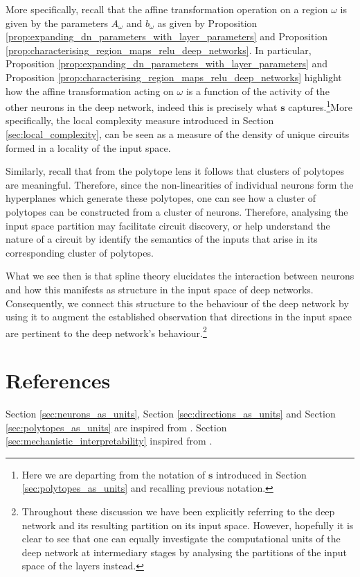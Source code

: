 More specifically, recall that the affine transformation operation on a region $\omega$ is given by the parameters $A_{\omega}$ and $b_{\omega}$ as given by Proposition \ref{prop:expanding_dn_parameters_with_layer_parameters} and Proposition \ref{prop:characterising_region_maps_relu_deep_networks}. In particular, Proposition \ref{prop:expanding_dn_parameters_with_layer_parameters} and Proposition \ref{prop:characterising_region_maps_relu_deep_networks} highlight how the affine transformation acting on $\omega$ is a function of the activity of the other neurons in the deep network, indeed this is precisely what $\mathbf{s}$ captures.\footnote{Here we are departing from the notation of $\mathbf{s}$ introduced in Section \ref{sec:polytopes_as_units} and recalling previous notation.}More specifically, the local complexity measure introduced in Section \ref{sec:local_complexity}, can be seen as a measure of the density of unique circuits formed in a locality of the input space. 

Similarly, recall that from the polytope lens it follows that clusters of polytopes are meaningful. Therefore, since the non-linearities of individual neurons form the hyperplanes which generate these polytopes, one can see how a cluster of polytopes can be constructed from a cluster of neurons. Therefore, analysing the input space partition may facilitate circuit discovery, or help understand the nature of a circuit by identify the semantics of the inputs that arise in its corresponding cluster of polytopes.

What we see then is that spline theory elucidates the interaction between neurons and how this manifests as structure in the input space of deep networks. Consequently, we connect this structure to the behaviour of the deep network by using it to augment the established observation that directions in the input space are pertinent to the deep network's behaviour.\footnote{Throughout these discussion we have been explicitly referring to the deep network and its resulting partition on its input space. However, hopefully it is clear to see that one can equally investigate the computational units of the deep network at intermediary stages by analysing the partitions of the input space of the layers instead.}

\section{References}

Section \ref{sec:neurons_as_units}, Section \ref{sec:directions_as_units} and Section \ref{sec:polytopes_as_units} are inspired from \citet{blackInterpretingNeuralNetworks2022}. Section \ref{sec:mechanistic_interpretability} inspired from \citet{humayunDeepNetworksAlways2024}.
